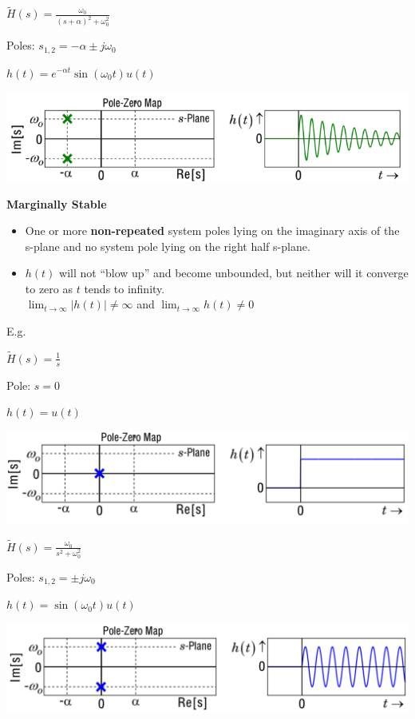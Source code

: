 \documentclass[landscape,a4paper]{extarticle}
\newenvironment{Figure}
  {\par\medskip\noindent\minipage{\linewidth}}
  {\endminipage\par\medskip}
\begin{document}
\begin{multicols*}{5}
    $\tilde{H}(s) = \frac{\omega_0}{(s + \alpha)^2 + \omega_0^2}$

    Poles: $s_{1,2} = -\alpha \pm j\omega_0$

    $h(t) = e^{-\alpha t} \sin (\omega_0 t) u (t)$

    \begin{Figure}
        \centering
        \includegraphics[width=\linewidth]{biboStable2.png}        
    \end{Figure}

    \textbf{Marginally Stable}
    \begin{itemize}
        \item One or more \textbf{non-repeated} system poles lying on the imaginary axis of the s-plane and no system pole lying on the right half s-plane.
        \item $h(t)$ will not ``blow up'' and become unbounded, but neither will it converge to zero as $t$ tends to infinity.\\
        $\lim_{t \to \infty} |h(t)| \neq \infty$ and $\lim_{t \to \infty} h(t) \neq 0$
    \end{itemize}

    E.g.

    $\tilde{H}(s) = \frac{1}{s}$

    Pole: $s = 0$

    $h(t) = u(t)$
    \begin{Figure}
        \centering
        \includegraphics[width=\linewidth]{marginallyStable1.png}        
    \end{Figure}

    $\tilde{H}(s) = \frac{\omega_0}{s^2 + \omega_0^2}$

    Poles: $s_{1,2} = \pm j\omega_0$

    $h(t) = \sin (\omega_0 t) u (t)$

    \begin{Figure}
        \centering
        \includegraphics[width=\linewidth]{marginallyStable2.png}        
    \end{Figure}


\end{multicols*}
\end{document}
